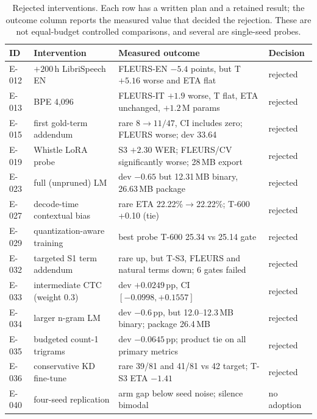 \documentclass{article}
\begin{document}
\begin{table}[t]
\centering
\footnotesize
\setlength{\tabcolsep}{2.6pt}
\caption{Rejected interventions. Each row has a written plan and a retained result; the outcome
column reports the measured value that decided the rejection. These are not equal-budget
controlled comparisons, and several are single-seed probes.}
\label{tab:negative}
\begin{tabular}{@{}p{0.9cm}>{\raggedright\arraybackslash}p{3.0cm}>{\raggedright\arraybackslash}p{4.9cm}l@{}}
\toprule
ID & Intervention & Measured outcome & Decision \\
\midrule
E-012 & $+200$\,h LibriSpeech EN & FLEURS-EN $-5.4$ points, but T $+5.16$ worse and ETA flat & rejected \\
E-013 & BPE 4{,}096 & FLEURS-IT $+1.9$ worse, T flat, ETA unchanged, $+1.2$\,M params & rejected \\
E-015 & first gold-term addendum & rare $8\to11/47$, CI includes zero; FLEURS worse; dev 33.64 & rejected \\
E-019 & Whistle LoRA probe & S3 $+2.30$ WER; FLEURS/CV significantly worse; 28\,MB export & rejected \\
E-023 & full (unpruned) LM & dev $-0.65$ but 12.31\,MB binary, 26.63\,MB package & rejected \\
E-027 & decode-time contextual bias & rare ETA 22.22\%$\to$22.22\%; T-600 +0.10 (tie) & rejected \\
E-029 & quantization-aware training & best probe T-600 25.34 vs 25.14 gate & rejected \\
E-032 & targeted S1 term addendum & rare up, but T-S3, FLEURS and natural terms down; 6 gates failed & rejected \\
E-033 & intermediate CTC (weight 0.3) & dev $+0.0249$\,pp, CI $[-0.0998,+0.1557]$ & rejected \\
E-034 & larger n-gram LM & dev $-0.6$\,pp, but 12.0--12.3\,MB binary; package 26.4\,MB & rejected \\
E-035 & budgeted count-1 trigrams & dev $-0.0645$\,pp; product tie on all primary metrics & rejected \\
E-036 & conservative KD fine-tune & rare 39/81 and 41/81 vs 42 target; T-S3 ETA $-1.41$ & rejected \\
E-040 & four-seed replication & arm gap below seed noise; silence bimodal & no adoption \\
\bottomrule
\end{tabular}
\end{table}
\end{document}
